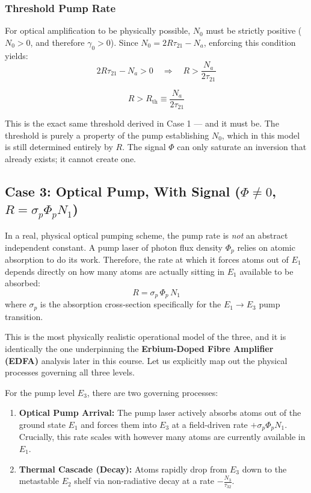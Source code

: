\subsubsection*{Threshold Pump Rate}

For optical amplification to be physically possible, $N_0$ must be strictly positive ($N_0 > 0$, and therefore $\gamma_0 > 0$). Since $N_0 = 2R\tau_{21} - N_a$, enforcing this condition yields:
\begin{equation*}
    2R\tau_{21} - N_a > 0 \quad \Longrightarrow \quad R > \frac{N_a}{2\tau_{21}}
\end{equation*}
\begin{keyresult}
    \begin{equation}
        R > R_\text{th} \equiv \frac{N_a}{2\tau_{21}}
    \end{equation}
\end{keyresult}

This is the exact same threshold derived in Case 1 — and it must be. The threshold is purely a property of the pump establishing $N_0$, which in this model is still determined entirely by $R$. The signal $\Phi$ can only saturate an inversion that already exists; it cannot create one.

\subsection{Case 3: Optical Pump, With Signal (\texorpdfstring{$\Phi \neq 0$, $R = \sigma_p\Phi_p N_1$}{realistic pump model})}

In a real, physical optical pumping scheme, the pump rate is \emph{not} an abstract independent constant. A pump laser of photon flux density $\Phi_p$ relies on atomic absorption to do its work. Therefore, the rate at which it forces atoms out of $E_1$ depends directly on how many atoms are actually sitting in $E_1$ available to be absorbed:
\begin{equation*}
    R = \sigma_p\,\Phi_p\,N_1
\end{equation*}
where $\sigma_p$ is the absorption cross-section specifically for the $E_1 \to E_3$ pump transition.

This is the most physically realistic operational model of the three, and it is identically the one underpinning the \textbf{Erbium-Doped Fibre Amplifier (EDFA)} analysis later in this course. Let us explicitly map out the physical processes governing all three levels.

For the pump level $E_3$, there are two governing processes:
\begin{enumerate}
    \item \textbf{Optical Pump Arrival:} The pump laser actively absorbs atoms out of the ground state $E_1$ and forces them into $E_3$ at a field-driven rate $+\sigma_p\Phi_p N_1$. Crucially, this rate scales with however many atoms are currently available in $E_1$.
    \item \textbf{Thermal Cascade (Decay):} Atoms rapidly drop from $E_3$ down to the metastable $E_2$ shelf via non-radiative decay at a rate $-\frac{N_3}{\tau_{32}}$.
\end{enumerate}

